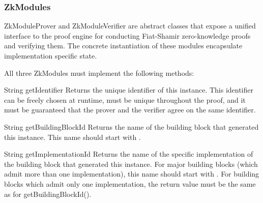     \subsubsection{ZkModules}
    ZkModuleProver and ZkModuleVerifier are abstract classes that expose a unified interface to
    the proof engine for conducting Fiat-Shamir zero-knowledge proofs and verifying them.
    The concrete instantiation of these modules encapsulate implementation specific state.

    All three ZkModules must implement the following methods:
    \begin{getter}
    {String}
    {getIdentifier}
    Returns the unique identifier of this instance. This identifier can be freely chosen at runtime,
    must be unique throughout the proof, and
    it must be guaranteed that the prover and the verifier agree on the same identifier.
    \end{getter}
    \begin{getter}
    {String}
    {getBuildingBlockId}
    Returns the name of the building block that generated this instance.
    This name should start with .
    \end{getter}
    \begin{getter}
    {String}
    {getImplementationId}
    Returns the name of the specific implementation of the building block that generated this instance.
    For major building blocks (which admit more than one implementation), this name should start with .
    For building blocks which admit only one implementation, the return value
    must be the same as for getBuildingBlockId().
    \end{getter}


